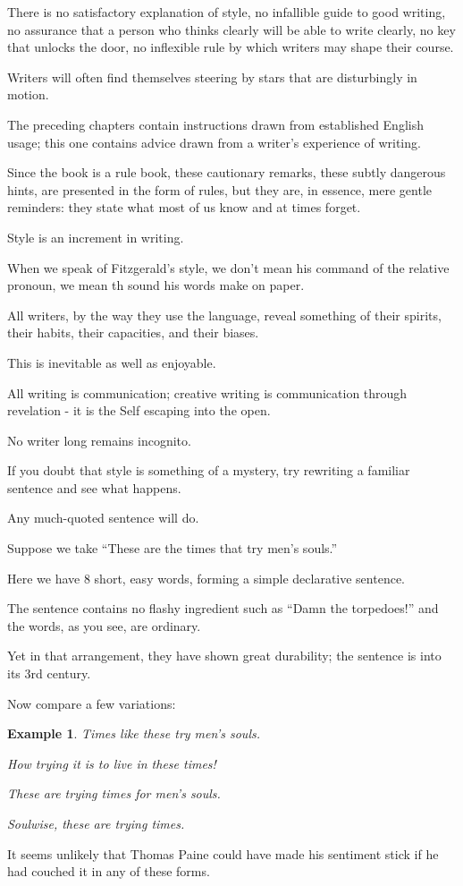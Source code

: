 \documentclass{article}
\newtheorem{example}{Example}
\begin{document}
There is no satisfactory explanation of style, no infallible guide to good writing, no assurance that a person who thinks clearly will be able to write clearly, no key that unlocks the door, no inflexible rule by which writers may shape their course.

Writers will often find themselves steering by stars that are disturbingly in motion.

%
The preceding chapters contain instructions drawn from established English usage; this one contains advice drawn from a writer's experience of writing.

Since the book is a rule book, these cautionary remarks, these subtly dangerous hints, are presented in the form of rules, but they are, in essence, mere gentle reminders: they state what most of us know and at times forget.

%
Style is an increment in writing.

When we speak of Fitzgerald's style, we don't mean his command of the relative pronoun, we mean th sound his words make on paper.

All writers, by the way they use the language, reveal something of their spirits, their habits, their capacities, and their biases.

This is inevitable as well as enjoyable.

All writing is communication; creative writing is communication through revelation - it is the Self escaping into the open.

No writer long remains incognito.

%
If you doubt that style is something of a mystery, try rewriting a familiar sentence and see what happens.

Any much-quoted sentence will do.

Suppose we take ``These are the times that try men's souls.''

Here we have 8 short, easy words, forming a simple declarative sentence.

The sentence contains no flashy ingredient such as ``Damn the torpedoes!'' and the words, as you see, are ordinary.

Yet in that arrangement, they have shown great durability; the sentence is into its 3rd century.

Now compare a few variations:
\begin{example}
	Times like these try men's souls.
	
	How trying it is to live in these times!
	
	These are trying times for men's souls.
	
	Soulwise, these are trying times.
\end{example}
It seems unlikely that Thomas Paine could have made his sentiment stick if he had couched it in any of these forms.
\end{document}
